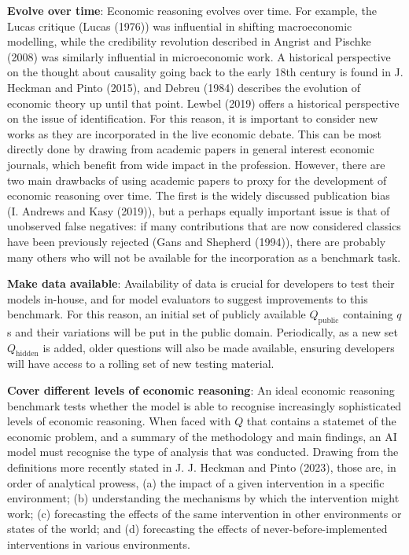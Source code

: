 \documentclass[
]{article}
\theoremstyle{plain}
\theoremstyle{definition}
\theoremstyle{remark}
\begin{document}
\textbf{Evolve over time}: Economic reasoning evolves over time. For
example, the Lucas critique (Lucas (1976)) was influential in shifting
macroeconomic modelling, while the credibility revolution described in
Angrist and Pischke (2008) was similarly influential in microeconomic
work. A historical perspective on the thought about causality going back
to the early 18th century is found in J. Heckman and Pinto (2015), and
Debreu (1984) describes the evolution of economic theory up until that
point. Lewbel (2019) offers a historical perspective on the issue of
identification. For this reason, it is important to consider new works
as they are incorporated in the live economic debate. This can be most
directly done by drawing from academic papers in general interest
economic journals, which benefit from wide impact in the profession.
However, there are two main drawbacks of using academic papers to proxy
for the development of economic reasoning over time. The first is the
widely discussed publication bias (I. Andrews and Kasy (2019)), but a
perhaps equally important issue is that of unobserved false negatives:
if many contributions that are now considered classics have been
previously rejected (Gans and Shepherd (1994)), there are probably many
others who will not be available for the incorporation as a benchmark
task.

\textbf{Make data available}: Availability of data is crucial for
developers to test their models in-house, and for model evaluators to
suggest improvements to this benchmark. For this reason, an initial set
of publicly available \(Q_{\text{public}}\) containing \(q\)s and their
variations will be put in the public domain. Periodically, as a new set
\(Q_{\text{hidden}}\) is added, older questions will also be made
available, ensuring developers will have access to a rolling set of new
testing material.

\textbf{Cover different levels of economic reasoning}: An ideal economic
reasoning benchmark tests whether the model is able to recognise
increasingly sophisticated levels of economic reasoning. When faced with
\(Q\) that contains a statemet of the economic problem, and a summary of
the methodology and main findings, an AI model must recognise the type
of analysis that was conducted. Drawing from the definitions more
recently stated in J. J. Heckman and Pinto (2023), those are, in order
of analytical prowess, (a) the impact of a given intervention in a
specific environment; (b) understanding the mechanisms by which the
intervention might work; (c) forecasting the effects of the same
intervention in other environments or states of the world; and (d)
forecasting the effects of never-before-implemented interventions in
various environments.
\end{document}
